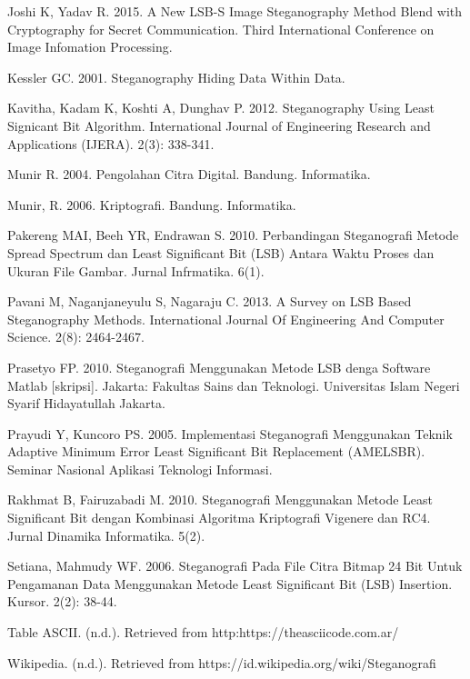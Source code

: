 \documentclass{jtetiskripsi}
\begin{document}
\begin{thebibliography}{99}
	 Joshi K, Yadav R. 2015. A New LSB-S Image Steganography Method Blend with Cryptography for Secret Communication. Third International Conference on Image Infomation Processing.
	
	 Kessler GC. 2001. Steganography Hiding Data Within Data.
	
	 Kavitha, Kadam K, Koshti A, Dunghav P. 2012. Steganography Using Least Signicant Bit Algorithm. International Journal of Engineering Research and Applications (IJERA). 2(3): 338-341.
	
	 Munir R. 2004. Pengolahan Citra Digital. Bandung. Informatika.
	
	 Munir, R. 2006. Kriptografi. Bandung. Informatika.
	
	 Pakereng MAI, Beeh YR, Endrawan S. 2010. Perbandingan Steganografi Metode Spread Spectrum dan Least Significant Bit (LSB) Antara Waktu Proses dan Ukuran File Gambar. Jurnal Infrmatika. 6(1).
	
	 Pavani M, Naganjaneyulu S, Nagaraju C. 2013. A Survey on LSB Based Steganography Methods. International Journal Of Engineering And Computer Science. 2(8): 2464-2467.
	
	 Prasetyo FP. 2010. Steganografi Menggunakan Metode LSB denga Software Matlab [skripsi]. Jakarta: Fakultas Sains dan Teknologi. Universitas Islam Negeri Syarif Hidayatullah Jakarta.
	
	 Prayudi Y, Kuncoro PS. 2005. Implementasi Steganografi Menggunakan Teknik Adaptive Minimum Error Least Significant Bit Replacement (AMELSBR). Seminar Nasional Aplikasi Teknologi Informasi.
	
	 Rakhmat B, Fairuzabadi M. 2010. Steganografi Menggunakan Metode Least Significant Bit dengan Kombinasi Algoritma Kriptografi Vigenere dan RC4. Jurnal Dinamika Informatika. 5(2).
	
	 Setiana, Mahmudy WF. 2006. Steganografi Pada File Citra Bitmap 24 Bit Untuk Pengamanan Data Menggunakan Metode Least Significant Bit (LSB) Insertion. Kursor. 2(2): 38-44.
	
	 Table ASCII. (n.d.). Retrieved from http:https://theasciicode.com.ar/
	
	 Wikipedia. (n.d.). Retrieved from https://id.wikipedia.org/wiki/Steganografi
		
		
	
\end{thebibliography}





\end{document}
